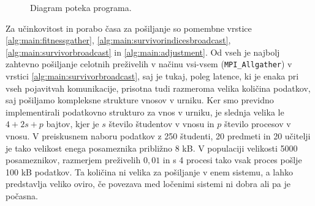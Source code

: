 \documentclass[a4paper,12pt]{book}
\begin{document}
\begin{figure}
\caption{Diagram poteka programa. }
\label{img:diagram}
\end{figure}

Za učinkovitost in porabo časa za pošiljanje so pomembne vrstice \ref{alg:main:fitnessgather}, \ref{alg:main:survivorindicesbroadcast}, \ref{alg:main:survivorbroadcast} in \ref{alg:main:adjustment}. Od vseh je najbolj zahtevno pošiljanje celotnih preživelih v načinu vsi-vsem (\texttt{MPI\_Allgather}) v vrstici \ref{alg:main:survivorbroadcast}, saj je tukaj, poleg latence, ki je enaka pri vseh pojavitvah komunikacije, prisotna tudi razmeroma velika količina podatkov, saj pošiljamo kompleksne strukture vnosov v urniku. Ker smo previdno implementirali podatkovno strukturo za vnos v urniku, je slednja velika le $4 + 2s + p$ bajtov, kjer je $s$ število študentov v vnosu in $p$ število procesov v vnosu. V preiskusnem naboru podatkov z 250 študenti, 20 predmeti in 20 učitelji je tako velikost enega posameznika približno 8 kB. V populaciji velikosti 5000 posameznikov, razmerjem preživelih $0{,}01$ in s 4 procesi tako vsak proces pošlje 100 kB podatkov. Ta količina ni velika za pošiljanje v enem sistemu, a lahko predstavlja veliko oviro, če povezava med ločenimi sistemi ni dobra ali pa je počasna. 
\end{document}
